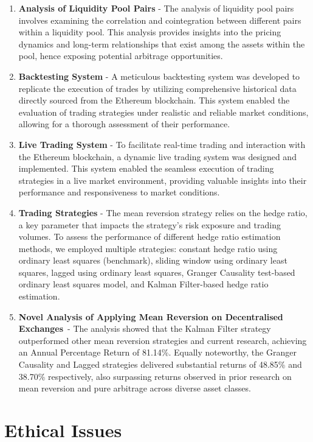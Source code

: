 \begin{enumerate}[wide, labelwidth=!, labelindent=2ex]
    \itemsep-0.1em
    \item \textbf{Analysis of Liquidity Pool Pairs} - The analysis of liquidity pool pairs involves examining the correlation and cointegration between different pairs within a liquidity pool. This analysis provides insights into the pricing dynamics and long-term relationships that exist among the assets within the pool, hence exposing potential arbitrage opportunities. 
    \item \textbf{Backtesting System} - A meticulous backtesting system was developed to replicate the execution of trades by utilizing comprehensive historical data directly sourced from the Ethereum blockchain. This system enabled the evaluation of trading strategies under realistic and reliable market conditions, allowing for a thorough assessment of their performance.
    \item \textbf{Live Trading System} - To facilitate real-time trading and interaction with the Ethereum blockchain, a dynamic live trading system was designed and implemented. This system enabled the seamless execution of trading strategies in a live market environment, providing valuable insights into their performance and responsiveness to market conditions.
    \item \textbf{Trading Strategies} - The mean reversion strategy relies on the hedge ratio, a key parameter that impacts the strategy's risk exposure and trading volumes. To assess the performance of different hedge ratio estimation methods, we employed multiple strategies: constant hedge ratio using ordinary least squares (benchmark), sliding window using ordinary least squares, lagged using ordinary least squares, Granger Causality test-based ordinary least squares model, and Kalman Filter-based hedge ratio estimation.
    \item \textbf{Novel Analysis of Applying Mean Reversion on Decentralised Exchanges}~- The analysis showed that the Kalman Filter strategy outperformed other mean reversion strategies and current research, achieving an Annual Percentage Return of 81.14\%. Equally noteworthy, the Granger Causality and Lagged strategies delivered substantial returns of 48.85\% and 38.70\% respectively, also surpassing returns observed in prior research on mean reversion and pure arbitrage across diverse asset classes.
\end{enumerate}

\section{Ethical Issues}

